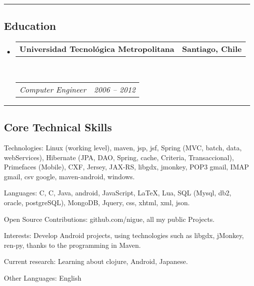 \documentclass[10pt,letterpaper]{article}
\makeatletter
\newenvironment{indentsection}[1]%
{\begin{list}{}%
	{\setlength{\leftmargin}{#1}}%
	\item[]%
}
{\end{list}}
\newcommand{\headerrow}[2]
{\begin{tabular*}{\linewidth}{l@{\extracolsep{\fill}}r}
	#1 &
	#2 \\
\end{tabular*}}
\newcommand{\CPP}
{C\nolinebreak[4]\hspace{-.05em}\raisebox{.22ex}{\footnotesize\bf ++}}
\makeatother
\begin{document}
\hrule
\vspace{-0.4em}
\subsection*{Education}

\begin{itemize}
	\parskip=0.1em

	\item 
	\headerrow
		{\textbf{Universidad Tecnológica Metropolitana}}
		{\textbf{Santiago, Chile}}
	\\
	\headerrow
		{\emph{Computer Engineer}}
		{\emph{2006 -- 2012}}

\end{itemize}


\hrule
\vspace{-0.4em}
\subsection*{Core Technical Skills}

\begin{indentsection}{\parindent}
\begin{description*}
	\item[Technologies:]
	Linux (working level), maven, jsp, jsf, Spring (MVC, batch, data, webServices), Hibernate (JPA, DAO, Spring, cache, Criteria, Transaccional), Primefaces (Mobile), CXF, Jersey, JAX-RS, libgdx, jmonkey, POP3 gmail, IMAP gmail, csv google, maven-android, windows.
	\item[Languages:]
	C, \CPP, Java, android, JavaScript, \LaTeX, Lua, SQL (Mysql, db2, oracle, postgreSQL), MongoDB, Jquery, css, xhtml, xml, json.
	\item[Open Source Contributions:]
	github.com/nigue, all my public Projects.
	\item[Interests:]
	Develop Android projects, using technologies such as libgdx, jMonkey, ren-py, thanks to the programming in Maven.
	\item[Current research:]
	Learning about clojure, Android, Japanese.
	\item[Other Languages:]
	English
\end{description*}
\end{indentsection}
\end{document}
